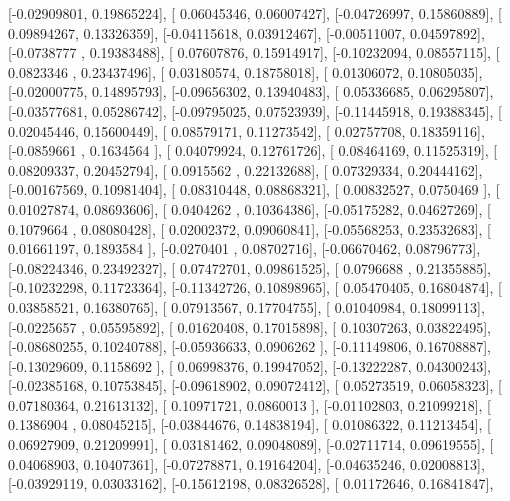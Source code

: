 \documentclass{article}
\begin{document}
       [-0.02909801,  0.19865224],
       [ 0.06045346,  0.06007427],
       [-0.04726997,  0.15860889],
       [ 0.09894267,  0.13326359],
       [-0.04115618,  0.03912467],
       [-0.00511007,  0.04597892],
       [-0.0738777 ,  0.19383488],
       [ 0.07607876,  0.15914917],
       [-0.10232094,  0.08557115],
       [ 0.0823346 ,  0.23437496],
       [ 0.03180574,  0.18758018],
       [ 0.01306072,  0.10805035],
       [-0.02000775,  0.14895793],
       [-0.09656302,  0.13940483],
       [ 0.05336685,  0.06295807],
       [-0.03577681,  0.05286742],
       [-0.09795025,  0.07523939],
       [-0.11445918,  0.19388345],
       [ 0.02045446,  0.15600449],
       [ 0.08579171,  0.11273542],
       [ 0.02757708,  0.18359116],
       [-0.0859661 ,  0.1634564 ],
       [ 0.04079924,  0.12761726],
       [ 0.08464169,  0.11525319],
       [ 0.08209337,  0.20452794],
       [ 0.0915562 ,  0.22132688],
       [ 0.07329334,  0.20444162],
       [-0.00167569,  0.10981404],
       [ 0.08310448,  0.08868321],
       [ 0.00832527,  0.0750469 ],
       [ 0.01027874,  0.08693606],
       [ 0.0404262 ,  0.10364386],
       [-0.05175282,  0.04627269],
       [ 0.1079664 ,  0.08080428],
       [ 0.02002372,  0.09060841],
       [-0.05568253,  0.23532683],
       [ 0.01661197,  0.1893584 ],
       [-0.0270401 ,  0.08702716],
       [-0.06670462,  0.08796773],
       [-0.08224346,  0.23492327],
       [ 0.07472701,  0.09861525],
       [ 0.0796688 ,  0.21355885],
       [-0.10232298,  0.11723364],
       [-0.11342726,  0.10898965],
       [ 0.05470405,  0.16804874],
       [ 0.03858521,  0.16380765],
       [ 0.07913567,  0.17704755],
       [ 0.01040984,  0.18099113],
       [-0.0225657 ,  0.05595892],
       [ 0.01620408,  0.17015898],
       [ 0.10307263,  0.03822495],
       [-0.08680255,  0.10240788],
       [-0.05936633,  0.0906262 ],
       [-0.11149806,  0.16708887],
       [-0.13029609,  0.1158692 ],
       [ 0.06998376,  0.19947052],
       [-0.13222287,  0.04300243],
       [-0.02385168,  0.10753845],
       [-0.09618902,  0.09072412],
       [ 0.05273519,  0.06058323],
       [ 0.07180364,  0.21613132],
       [ 0.10971721,  0.0860013 ],
       [-0.01102803,  0.21099218],
       [ 0.1386904 ,  0.08045215],
       [-0.03844676,  0.14838194],
       [ 0.01086322,  0.11213454],
       [ 0.06927909,  0.21209991],
       [ 0.03181462,  0.09048089],
       [-0.02711714,  0.09619555],
       [ 0.04068903,  0.10407361],
       [-0.07278871,  0.19164204],
       [-0.04635246,  0.02008813],
       [-0.03929119,  0.03033162],
       [-0.15612198,  0.08326528],
       [ 0.01172646,  0.16841847],
\end{document}
